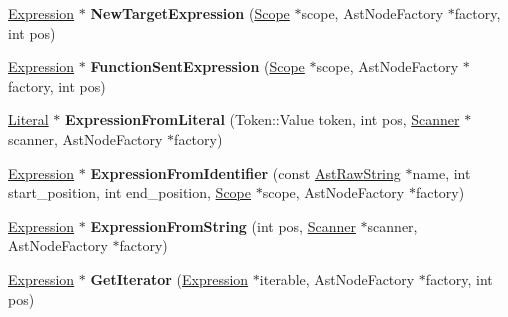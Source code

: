 \begin{DoxyCompactItemize}
\item 
\hyperlink{classv8_1_1internal_1_1_expression}{Expression} $\ast$ {\bfseries New\+Target\+Expression} (\hyperlink{classv8_1_1internal_1_1_scope}{Scope} $\ast$scope, Ast\+Node\+Factory $\ast$factory, int pos)\hypertarget{classv8_1_1internal_1_1_parser_traits_aa659e357459b9679577d2d4a7ba87d87}{}\label{classv8_1_1internal_1_1_parser_traits_aa659e357459b9679577d2d4a7ba87d87}

\item 
\hyperlink{classv8_1_1internal_1_1_expression}{Expression} $\ast$ {\bfseries Function\+Sent\+Expression} (\hyperlink{classv8_1_1internal_1_1_scope}{Scope} $\ast$scope, Ast\+Node\+Factory $\ast$factory, int pos)\hypertarget{classv8_1_1internal_1_1_parser_traits_a7bb915c302c9e3999c488b703fc5130e}{}\label{classv8_1_1internal_1_1_parser_traits_a7bb915c302c9e3999c488b703fc5130e}

\item 
\hyperlink{classv8_1_1internal_1_1_literal}{Literal} $\ast$ {\bfseries Expression\+From\+Literal} (Token\+::\+Value token, int pos, \hyperlink{classv8_1_1internal_1_1_scanner}{Scanner} $\ast$scanner, Ast\+Node\+Factory $\ast$factory)\hypertarget{classv8_1_1internal_1_1_parser_traits_a739da574e8066c5e7c63e5d619289fb2}{}\label{classv8_1_1internal_1_1_parser_traits_a739da574e8066c5e7c63e5d619289fb2}

\item 
\hyperlink{classv8_1_1internal_1_1_expression}{Expression} $\ast$ {\bfseries Expression\+From\+Identifier} (const \hyperlink{classv8_1_1internal_1_1_ast_raw_string}{Ast\+Raw\+String} $\ast$name, int start\+\_\+position, int end\+\_\+position, \hyperlink{classv8_1_1internal_1_1_scope}{Scope} $\ast$scope, Ast\+Node\+Factory $\ast$factory)\hypertarget{classv8_1_1internal_1_1_parser_traits_a938823938d83ce142b9a7155cbdf0ad4}{}\label{classv8_1_1internal_1_1_parser_traits_a938823938d83ce142b9a7155cbdf0ad4}

\item 
\hyperlink{classv8_1_1internal_1_1_expression}{Expression} $\ast$ {\bfseries Expression\+From\+String} (int pos, \hyperlink{classv8_1_1internal_1_1_scanner}{Scanner} $\ast$scanner, Ast\+Node\+Factory $\ast$factory)\hypertarget{classv8_1_1internal_1_1_parser_traits_a34ede555da8519ab286c94b3648c1e64}{}\label{classv8_1_1internal_1_1_parser_traits_a34ede555da8519ab286c94b3648c1e64}

\item 
\hyperlink{classv8_1_1internal_1_1_expression}{Expression} $\ast$ {\bfseries Get\+Iterator} (\hyperlink{classv8_1_1internal_1_1_expression}{Expression} $\ast$iterable, Ast\+Node\+Factory $\ast$factory, int pos)\hypertarget{classv8_1_1internal_1_1_parser_traits_ae1a656ceb34d59cfe61cf2b694cde503}{}\label{classv8_1_1internal_1_1_parser_traits_ae1a656ceb34d59cfe61cf2b694cde503}


\end{DoxyCompactItemize}
